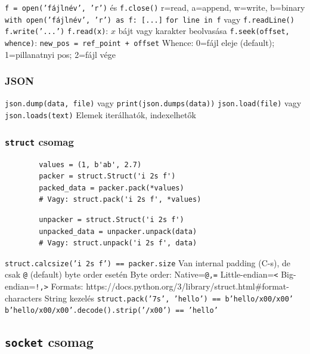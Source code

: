 \documentclass[12pt,a4paper]{article}
\begin{document}
\begin{outline}
	\1 \texttt{f = open('fájlnév', 'r')} és \texttt{f.close()}
	\2 r=read, a=append, w=write, b=binary
	\2 \texttt{with open('fájlnév', 'r') as f: [...]}
	\1 \texttt{for line in f} vagy \texttt{f.readLine()}
	\1 \texttt{f.write('...')}
	\1 \texttt{f.read(x)}: $x$ bájt vagy karakter beolvasása
	\1 \texttt{f.seek(offset, whence)}: \texttt{new\_pos = ref\_point + offset}
		\2 Whence: 0=fájl eleje (default); 1=pillanatnyi pos; 2=fájl vége
\end{outline}

\subsubsection{JSON}

\begin{outline}
	\1 \texttt{json.dump(data, file)} vagy \texttt{print(json.dumps(data))}
	\1 \texttt{json.load(file)} vagy \texttt{json.loads(text)}
	\1 Elemek iterálhatók, indexelhetők
\end{outline}

\pagebreak

\subsubsection{\texttt{struct} csomag}

\begin{outline}
	\1 \begin{verbatim}
		values = (1, b'ab', 2.7)
		packer = struct.Struct('i 2s f')
		packed_data = packer.pack(*values)
		# Vagy: struct.pack('i 2s f', *values)
	\end{verbatim}
	\1 \begin{verbatim}
		unpacker = struct.Struct('i 2s f')
		unpacked_data = unpacker.unpack(data)
		# Vagy: struct.unpack('i 2s f', data)
	\end{verbatim}
	\1 \texttt{struct.calcsize('i 2s f') == packer.size}
		\2 Van internal padding (C-s), de csak \texttt{@} (default) byte order esetén
	\1 Byte order: Native=\texttt{@,=} \;\; Little-endian=\texttt{<} \;\; Big-endian=\texttt{!,>}
	\1 Formats: https://docs.python.org/3/library/struct.html\#format-characters
	\1 String kezelés
		\2 \texttt{struct.pack('7s', 'hello') == b'hello/x00/x00'}
		\2 \texttt{b'hello/x00/x00'.decode().strip('/x00') == 'hello'}
\end{outline}

\subsection{\texttt{socket} csomag}
\end{document}
